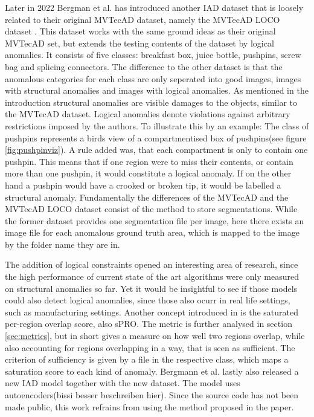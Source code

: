 Later in 2022 Bergman et al. has introduced another IAD dataset that is loosely related to their original MVTecAD dataset, namely the MVTecAD LOCO dataset \cite{LOCODentsAndScratchesBergmann2022}. 
This dataset works with the same ground ideas as their original MVTecAD set, but extends the testing contents of the dataset by logical anomalies. 
It consists of five classes: breakfast box, juice bottle, pushpins, screw bag and splicing connectors. The difference to the other dataset is that the anomalous categories for each class are only seperated into good images, images with structural anomalies 
and images with logical anomalies. As mentioned in the introduction structural anomalies are visible damages to the objects, similar to the MVTecAD dataset. Logical anomalies denote violations against arbitrary restrictions 
imposed by the authors. To illustrate this by an example: The class of pushpins represents a birds view of a compartmentised box of pushpins(see figure \ref{fig:pushpinviz}). A rule added was, 
that each compartment is only to contain one pushpin. This means that if one region were to miss their contents, or contain more than one pushpin, it would constitute a logical anomaly. If on the 
other hand a pushpin would have a crooked or broken tip, it would be  labelled a structural anomaly. Fundamentally the differences of the 
MVTecAD and the MVTecAD LOCO dataset consist of the method to store segmentations. While the former dataset provides one segmentation file per image, here there exists an image 
file for each anomalous ground truth area, which is mapped to the image by the folder name they are in.




The addition of logical constraints opened an interesting area of research, since the high performance 
of current state of the art algorithms were only measured on structural anomalies so far. Yet it would be insightful to see if those models could also detect logical anomalies, since those also ocurr 
in real life settings, such as manufacturing settings. Another concept introduced in \cite{LOCODentsAndScratchesBergmann2022} is the 
saturated per-region overlap score, also sPRO. The metric is further analysed in section \ref{sec:metrics}, but in short gives a measure 
on how well two regions overlap, while also accounting for regions overlapping in a way, that is seen as sufficient. The criterion of 
sufficiency is given by a file in the respective class, which maps a saturation score to each kind of anomaly.
Bergmann et al.\cite{LOCODentsAndScratchesBergmann2022} lastly also released a new IAD model together with the new dataset. The model uses autoencoders(bissi besser beschreiben hier). Since the source code has not been made public, 
this work refrains from using the method proposed in the paper.


